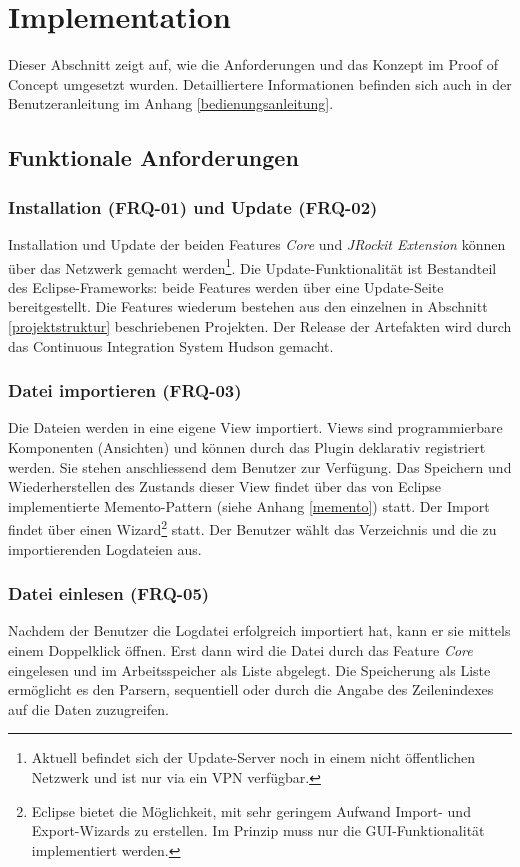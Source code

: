 \chapter{Implementation}\label{implementation}
Dieser Abschnitt zeigt auf, wie die Anforderungen und das Konzept im Proof of Concept umgesetzt wurden. Detailliertere Informationen befinden sich auch in der Benutzeranleitung im Anhang \ref{bedienungsanleitung}.
\section{Funktionale Anforderungen}
\subsection{Installation (FRQ-01) und Update (FRQ-02)}
Installation und Update der beiden Features \textit{Core} und \textit{JRockit Extension} können über das Netzwerk gemacht werden\footnote{Aktuell befindet sich der Update-Server noch in einem nicht öffentlichen Netzwerk und ist nur via ein VPN verfügbar.}. Die Update-Funktionalität ist Bestandteil des Eclipse-Frameworks: beide Features werden über eine Update-Seite bereitgestellt. Die Features wiederum bestehen aus den einzelnen in Abschnitt \ref{projektstruktur} beschriebenen Projekten. Der Release der Artefakten wird durch das Continuous Integration System Hudson gemacht.

\subsection{Datei importieren (FRQ-03)}
Die Dateien werden in eine eigene View importiert. Views sind programmierbare Komponenten (Ansichten) und können durch das Plugin deklarativ registriert werden. Sie stehen anschliessend dem Benutzer zur Verfügung. Das Speichern und Wiederherstellen des Zustands dieser View findet über das von Eclipse implementierte Memento-Pattern (siehe Anhang \ref{memento}) statt. Der Import findet über einen Wizard\footnote{Eclipse bietet die Möglichkeit, mit sehr geringem Aufwand Import- und Export-Wizards zu erstellen. Im Prinzip muss nur die GUI-Funktionalität implementiert werden.} statt. Der Benutzer wählt das Verzeichnis und die zu importierenden Logdateien aus.

\subsection{Datei einlesen (FRQ-05)}
Nachdem der Benutzer die Logdatei erfolgreich importiert hat, kann er sie mittels einem Doppelklick öffnen. Erst dann wird die Datei durch das Feature \textit{Core} eingelesen und im Arbeitsspeicher als Liste abgelegt. Die Speicherung als Liste ermöglicht es den Parsern, sequentiell oder durch die Angabe des Zeilenindexes auf die Daten zuzugreifen.

